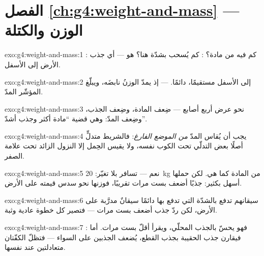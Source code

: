 \section*{الفصل \ref{ch:g4:weight-and-mass} --- الوزن والكتلة}

\begin{solution}{exo:g4:weight-and-mass:1}
: كم فيه من مادة؟ : كم يُسحب بشدّة هنا؟  هو
 --- أي جذب الأرض إلى الأسفل.
\end{solution}

\begin{solution}{exo:g4:weight-and-mass:2}
إلى الأسفل مستقيمًا، دائمًا.  --- إذ يمدّ
الوزنُ نابضَه، ويبلّغ المؤشّر المدّ.
\end{solution}

\begin{solution}{exo:g4:weight-and-mass:3}
نحو عرض أربع أصابع --- ضِعف المادة، وضِعف الجذب، وضِعف المدّ:
وهي قضية ``مادة أكثر وجذب أشدّ''.
\end{solution}

\begin{solution}{exo:g4:weight-and-mass:4}
يجب أن يُقاس المدّ \emph{من الموضع الفارغ}: فالشريط متدلٍّ أصلًا
بعض التدلّي تحت  الكوب نفسه، ولا يقيس الحِمل إلا النزول
الزائد تحت علامة الصفر.
\end{solution}

\begin{solution}{exo:g4:weight-and-mass:5}
نعم ---  تسافر بلا تغيّر: \qty{20}{kg} من المادة كما هي.
لكن حملها أسهل بكثير:   جذبًا أضعف بست مرات
تقريبًا، فوزنها نحو سدس قيمته على الأرض.
\end{solution}

\begin{solution}{exo:g4:weight-and-mass:6}
سيقانهم تدفع بالشدّة التي تدفع بها دائمًا سيقانٌ مدرَّبة على
الأرض، لكن ردّ جذب  أضعف بست مرات --- فتصير كل خطوة عادية
وثبة.
\end{solution}

\begin{solution}{exo:g4:weight-and-mass:7}
: فهو يحسّ بالجذب المحلّي، ويقرأ أقلّ بست مرات.
أما  فيقارن جذب الحقيبة بجذب القطع،  يُضعف
الجذبين على السواء --- فتظلّ الكفّتان متعادلتين عند 
نفسها.
\end{solution}

